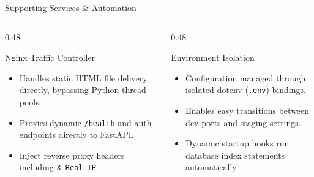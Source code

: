 \documentclass[aspectratio=169, 10pt]{beamer}
\begin{document}
\begin{frame}{Supporting Services \& Automation}
  \begin{columns}[T]
    \begin{column}{0.48\textwidth}
      \begin{scard}{Nginx Traffic Controller}
        \begin{itemize}
          \item Handles static HTML file delivery directly, bypassing Python thread pools.
          \item Proxies dynamic \texttt{/health} and auth endpoints directly to FastAPI.
          \item Inject reverse proxy headers including \texttt{X-Real-IP}.
        \end{itemize}
      \end{scard}
    \end{column}
    \begin{column}{0.48\textwidth}
      \begin{scard}{Environment Isolation}
        \begin{itemize}
          \item Configuration managed through isolated dotenv (\texttt{.env}) bindings.
          \item Enables easy transitions between dev ports and staging settings.
          \item Dynamic startup hooks run database index statements automatically.
        \end{itemize}
      \end{scard}
    \end{column}
  \end{columns}
\end{frame}
\end{document}
